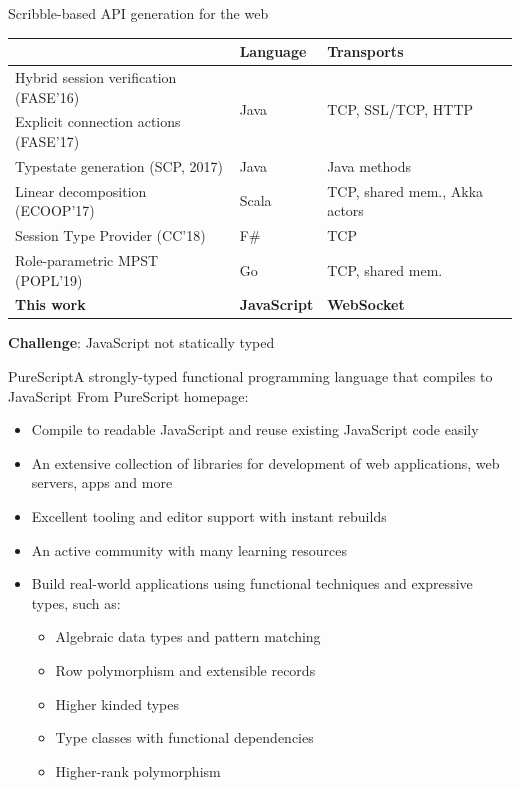 \documentclass[aspectratio=1610]{beamer}
\begin{document}
\begin{frame}{Scribble-based API generation for the web}
  \begin{table}
  \begin{tabular}{lll}
    \toprule
    & Language & Transports\\
    \midrule
    Hybrid session verification (FASE'16)  & \multirow{2}{*}{Java} &\multirow {2}{*}{\small TCP, SSL/TCP, HTTP}\\
    Explicit connection actions (FASE'17)  &      &\\
    Typestate generation (SCP, 2017)       & Java &\small Java methods\\
    Linear decomposition (ECOOP'17)        & Scala&\small TCP, shared mem., Akka actors\\
    Session Type Provider (CC'18)          & F\#  &\small TCP\\
    Role-parametric MPST (POPL'19)         & Go   &\small TCP, shared mem.\\
    \rowcolor{yellow!10} \textbf{This work}& \textbf{JavaScript} &\small \textbf{WebSocket} \\
    \bottomrule
  \end{tabular}
  \end{table}

  \textbf{Challenge}: JavaScript not statically typed
\end{frame}

\begin{frame}{PureScript}{A strongly-typed functional programming language that compiles to JavaScript}
  From PureScript homepage:
  \begin{itemize}
    \item \alert<2>{Compile to readable JavaScript} and reuse existing JavaScript code easily
    \item An extensive collection of libraries for development of web applications, web servers, apps and more
    \item Excellent tooling and editor support with instant rebuilds
    \item An active community with many learning resources
    \item Build real-world applications using functional techniques and expressive types, such as:
      \begin{itemize}
        \item Algebraic data types and pattern matching
        \item \alert<2>{Row polymorphism} and extensible records
        \item Higher kinded types
        \item \alert<2>{Type classes with functional dependencies}
        \item Higher-rank polymorphism
      \end{itemize}
  \end{itemize}
\end{frame}
\end{document}
